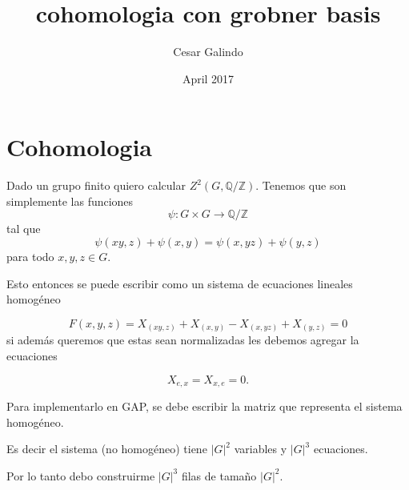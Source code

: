 \documentclass{amsart}
\title{cohomologia con grobner basis}
\author{Cesar Galindo}
\date{April 2017}
\begin{document}
\maketitle

\section{Cohomologia}

Dado un grupo finito quiero calcular $Z^2(G,\mathbb{Q}/\mathbb{Z})$. Tenemos que son simplemente las funciones \[\psi: G\times G\to \mathbb{Q}/\mathbb{Z}\] tal que \[\psi(xy,z)+\psi(x,y)=\psi(x,yz)+\psi(y,z)\] para todo $x,y,z\in G$.

Esto entonces se puede escribir como un sistema de ecuaciones lineales homogéneo

\[F(x,y,z)=X_{(xy,z)}+X_{(x,y)}-X_{(x,yz)}+X_{(y,z)}=0\]
si además queremos que estas sean normalizadas les debemos agregar la ecuaciones

\[X_{e,x}=X_{x,e}=0.\]


Para implementarlo en GAP, se debe escribir la matriz que representa el sistema homogéneo.

Es decir el sistema (no homogéneo) tiene $|G|^2$ variables y $|G|^3$ ecuaciones.

Por lo tanto debo construirme $|G|^3$ filas de tamaño $|G|^2$.
\end{document}
